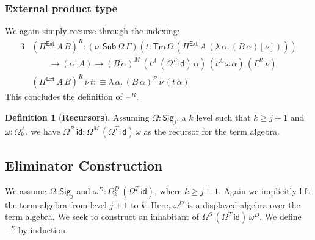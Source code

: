 \documentclass[12pt,a4paper,twoside,openany]{book}
\theoremstyle{remark}
\theoremstyle{definition}
\newtheorem{mydefinition}{Definition}
\theoremstyle{theorem}
\newcommand{\id}{\mathsf{id}}
\newcommand{\Sub}{\mathsf{Sub}}
\newcommand{\Tm}{\mathsf{Tm}}
\newcommand{\blank}{\mathord{\hspace{1pt}\text{--}\hspace{1pt}}}
\newcommand{\Pie}{\Pi^{\mathsf{Ext}}}
\newcommand{\Sig}{\mathsf{Sig}}
\newcommand{\defn}{:\equiv}
\begin{document}
\subsubsection{External product type}
We again simply recurse through the indexing:
\begin{alignat*}{3}
  & (\Pie\,A\,B)^R : (\nu : \Sub\,\Omega\,\Gamma)(t : \Tm\,\Omega\,(\Pie\,A\,(\lambda\,\alpha.\,(B\,\alpha)[\nu])))\\
  & \hspace{2em}\to (\alpha : A) \to (B\,\alpha)^M\,(t^A\,(\Omega^T\,\id)\,\alpha)\,(t^A\,\omega\,\alpha)\,(\Gamma^R\,\nu)\\
  &(\Pie\,A\,B)^R\,\nu\,t \defn \lambda\,\alpha.\,(B\,\alpha)^R\,\nu\,(t\,\alpha)
\end{alignat*}
This concludes the definition of $\blank^R$.

\begin{mydefinition}[\textbf{Recursors}]
Assuming $\Omega : \Sig_j$, a $k$ level such that $k \geq j + 1$ and $\omega :
\Omega^A_{k}$, we have $\Omega^R\,\id : \Omega^M\,(\Omega^T\,\id)\,\omega$ as
the recursor for the term algebra.
\end{mydefinition}

\subsection{Eliminator Construction}
\label{sec:fqii-eliminator-construction}

We assume $\Omega : \Sig_j$ and $\omega^D : \Omega^D_{k}\,(\Omega^T\,\id)$,
where $k \geq j + 1$. Again we implicitly lift the term algebra from level $j+1$
to $k$. Here, $\omega^D$ is a displayed algebra over the term algebra. We seek
to construct an inhabitant of $\Omega^S\,(\Omega^T\,\id)\,\omega^D$. We define
$\blank^E$ by induction.
\end{document}
